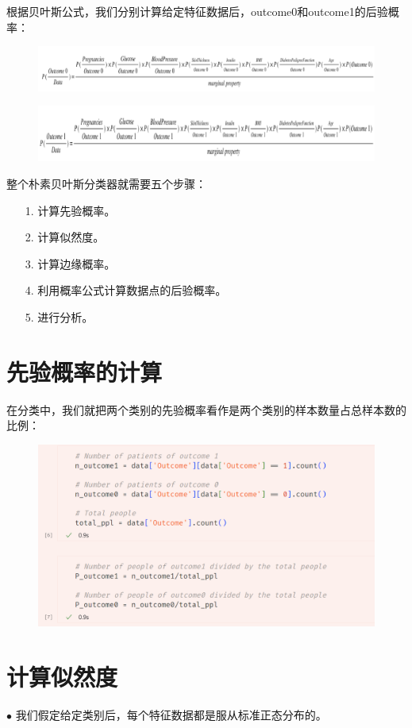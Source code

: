 \documentclass{article}
\begin{document}
根据贝叶斯公式，我们分别计算给定特征数据后，outcome0和outcome1的后验概率：
\begin{figure}[H]
	\centering
	\includegraphics[width=\linewidth]{outcome0.PNG}
\end{figure}
\begin{figure}[H]
	\centering
	\includegraphics[width=\linewidth]{outcome1.PNG}
\end{figure}

整个朴素贝叶斯分类器就需要五个步骤：
\begin{itemize}
	\item [1.] 计算先验概率。
	\item [2.] 计算似然度。
	\item [3.] 计算边缘概率。
	\item [4.] 利用概率公式计算数据点的后验概率。
	\item [5.] 进行分析。
\end{itemize}
\section{先验概率的计算}
在分类中，我们就把两个类别的先验概率看作是两个类别的样本数量占总样本数的比例：
\begin{figure}[H]
	\centering
	\includegraphics[width=0.7\linewidth]{3.png}
\end{figure}

\section{计算似然度}
$\bullet$ 我们假定给定类别后，每个特征数据都是服从标准正态分布的。
\end{document}
